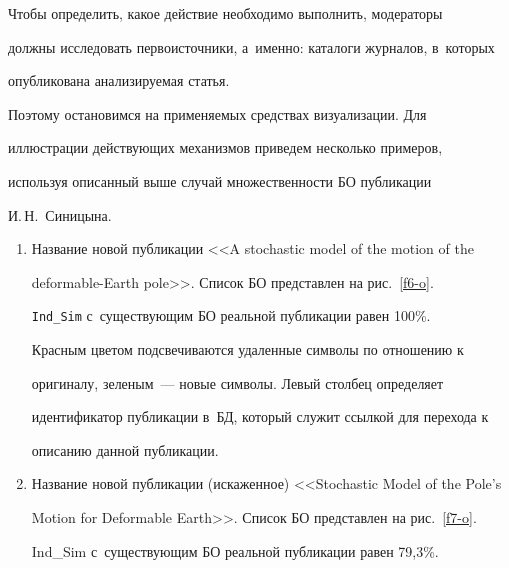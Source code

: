 {  Чтобы определить, какое действие необходимо выполнить, модераторы


должны исследовать первоисточники, а~именно: каталоги журналов, в~которых


опуб\-ли\-ко\-ва\-на анализируемая статья.


%


  Поэтому остановимся на применяемых средствах визуализации. Для


иллюстрации действующих механизмов приведем несколько примеров,


используя описанный выше случай множественности БО публикации


И.\,Н.~Синицына.


\begin{enumerate}[1.]


\item Название новой публикации <<A stochastic model of the motion of the


deformable-Earth pole>>. Список БО представлен на рис.~\ref{f6-o}.











  \verb"Ind_Sim" с~существующим БО реальной публикации равен 100\%.





  Красным цветом подсвечиваются удаленные символы по отношению к


оригиналу, зеленым~--- новые символы. Левый столбец определяет


идентификатор публикации в~БД, который служит ссылкой для перехода к


описанию данной публикации.








\item Название новой публикации (искаженное) <<Stochastic Model of the Pole's


Motion for Deformable Earth>>. Список БО представлен на рис.~\ref{f7-o}.





{\sf Ind\_Sim} с~существующим БО реальной публикации равен 79,3\%.









\end{enumerate}}
